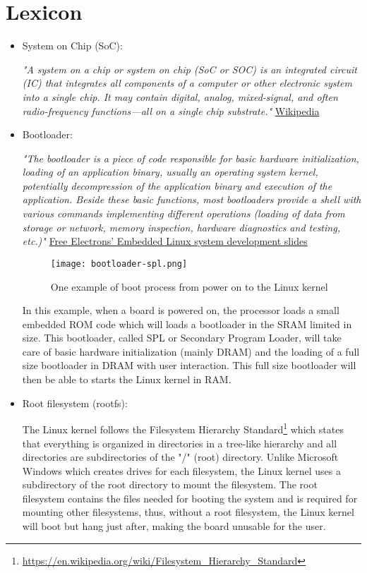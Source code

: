 \chapter*{Lexicon}

\begin{itemize}
\item System on Chip (SoC):

\textit{"A system on a chip or system on chip (SoC or SOC) is an integrated circuit (IC) that integrates all components of a computer or other electronic system into a single chip. It may contain digital, analog, mixed-signal, and often radio-frequency functions—all on a single chip substrate."} \href{https://en.wikipedia.org/wiki/System\_on\_a\_chip}{Wikipedia}

\item Bootloader:

\textit{"The bootloader is a piece of code responsible for basic hardware initialization, loading of an application binary, usually an operating system kernel, potentially decompression of the application binary and execution of the application. Beside these basic functions, most bootloaders provide a shell with various commands implementing different operations (loading of data from storage or network, memory inspection, hardware diagnostics and testing, etc.)"} \href{http://free-electrons.com/doc/training/embedded-linux/embedded-linux-slides.pdf}{Free Electrons' Embedded Linux system development slides}

\begin{figure}[H]
  \centering
  \texttt{[image: bootloader-spl.png]}
  \caption{One example of boot process from power on to the Linux kernel}
\end{figure}

In this example, when a board is powered on, the processor loads a small embedded ROM code which will loads a bootloader in the SRAM limited in size. This bootloader, called SPL or Secondary Program Loader, will take care of basic hardware initialization (mainly DRAM) and the loading of a full size bootloader in DRAM with user interaction. This full size bootloader will then be able to starts the Linux kernel in RAM.

\item Root filesystem (rootfs):

The Linux kernel follows the Filesystem Hierarchy Standard\footnote{\url{https://en.wikipedia.org/wiki/Filesystem\_Hierarchy\_Standard}} which states that everything is organized in directories in a tree-like hierarchy and all directories are subdirectories of the "/" (root) directory. Unlike Microsoft Windows which creates drives for each filesystem, the Linux kernel uses a subdirectory of the root directory to mount the filesystem. The root filesystem contains the files needed for booting the system and is required for mounting other filesystems, thus, without a root filesystem, the Linux kernel will boot but hang just after, making the board unusable for the user.


\end{itemize}
